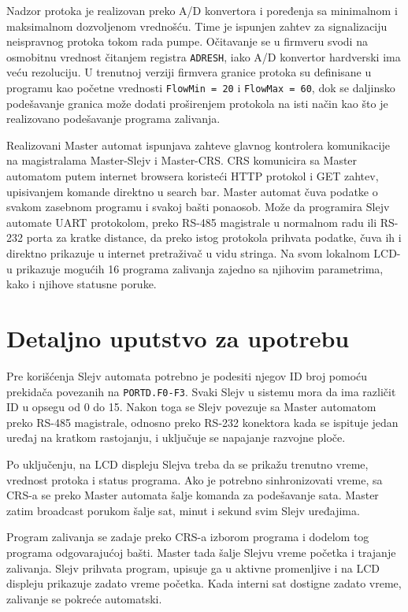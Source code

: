 \documentclass[12pt]{article}
\numberwithin{figure}{section}
\begin{document}
  Nadzor protoka je realizovan preko A/D konvertora i poređenja sa minimalnom i maksimalnom dozvoljenom vrednošću. 
  Time je ispunjen zahtev za signalizaciju neispravnog protoka tokom rada pumpe. 
  Očitavanje se u firmveru svodi na osmobitnu vrednost čitanjem registra \texttt{ADRESH}, iako A/D konvertor hardverski ima veću rezoluciju.
  U trenutnoj verziji firmvera granice protoka su definisane u programu kao početne vrednosti \texttt{FlowMin = 20} i \texttt{FlowMax = 60}, dok se daljinsko podešavanje granica može dodati proširenjem protokola na isti način kao što je realizovano podešavanje programa zalivanja.

  Realizovani Master automat ispunjava zahteve glavnog kontrolera komunikacije na magistralama Master-Slejv i Master-CRS. 
  CRS komunicira sa Master automatom putem internet browsera koristeći HTTP protokol i GET zahtev, upisivanjem komande direktno u search bar.
  Master automat čuva podatke o svakom zasebnom programu i svakoj bašti ponaosob. 
  Može da programira Slejv automate UART protokolom, preko RS-485 magistrale u normalnom radu ili RS-232 porta za kratke distance, da preko istog protokola prihvata podatke, čuva ih i direktno prikazuje u internet pretraživač u vidu stringa.
  Na svom lokalnom LCD-u prikazuje mogućih 16 programa zalivanja zajedno sa njihovim parametrima, kako i njihove statusne poruke.

\section{Detaljno uputstvo za upotrebu}

  Pre korišćenja Slejv automata potrebno je podesiti njegov ID broj pomoću prekidača povezanih na \texttt{PORTD.F0-F3}. 
  Svaki Slejv u sistemu mora da ima različit ID u opsegu od 0 do 15. 
  Nakon toga se Slejv povezuje sa Master automatom preko RS-485 magistrale, odnosno preko RS-232 konektora kada se ispituje jedan uređaj na kratkom rastojanju, i uključuje se napajanje razvojne ploče.

  Po uključenju, na LCD displeju Slejva treba da se prikažu trenutno vreme, vrednost protoka i status programa. 
  Ako je potrebno sinhronizovati vreme, sa CRS-a se preko Master automata šalje komanda za podešavanje sata. 
  Master zatim broadcast porukom šalje sat, minut i sekund svim Slejv uređajima.

  Program zalivanja se zadaje preko CRS-a izborom programa i dodelom tog programa odgovarajućoj bašti. 
  Master tada šalje Slejvu vreme početka i trajanje zalivanja. 
  Slejv prihvata program, upisuje ga u aktivne promenljive i na LCD displeju prikazuje zadato vreme početka. 
  Kada interni sat dostigne zadato vreme, zalivanje se pokreće automatski.
\end{document}
